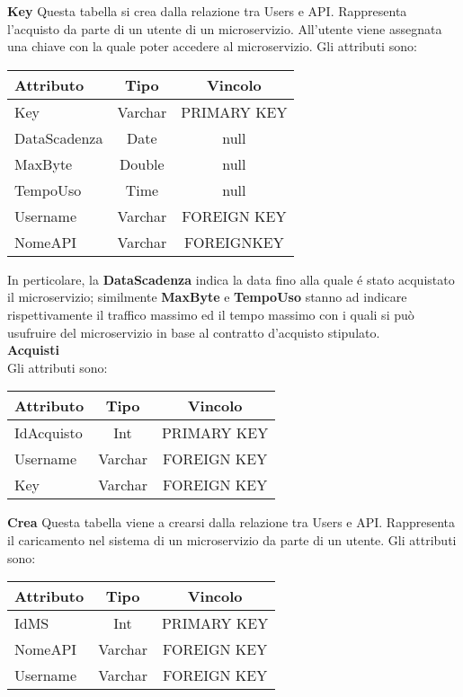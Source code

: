 {{		\textbf{Key}
			Questa tabella si crea dalla relazione tra Users e API. Rappresenta l'acquisto da parte di un utente di un microservizio. All'utente viene assegnata una chiave con la quale poter accedere al microservizio. Gli attributi sono:
			\begin{center}
			\begin{tabular}{lcc}
				\textbf{Attributo}&\textbf{Tipo}&\textbf{Vincolo}\\ \hline
				Key&Varchar&PRIMARY KEY\\
				DataScadenza&Date&null \\
				MaxByte&Double&null \\
				TempoUso&Time&null \\
				Username&Varchar&FOREIGN KEY\\
				NomeAPI&Varchar&FOREIGNKEY\\			
			\end{tabular}
			\end{center}
			In perticolare, la \textbf{DataScadenza} indica la data fino alla quale é stato acquistato il microservizio; similmente \textbf{MaxByte} e \textbf{TempoUso} stanno ad indicare rispettivamente il traffico massimo ed il tempo massimo con i quali si può usufruire del microservizio in base al contratto d'acquisto stipulato.\\
			
		\textbf{Acquisti}\\
		Gli attributi sono: \\
		\begin{center}
		\begin{tabular}{lcc}
			\textbf{Attributo}&\textbf{Tipo}&\textbf{Vincolo}\\ \hline
			IdAcquisto&Int&PRIMARY KEY\\
			Username&Varchar&FOREIGN KEY\\
			Key&Varchar&FOREIGN KEY\\
		\end{tabular}
		\end{center}
			
		\textbf{Crea}
			Questa tabella viene a crearsi dalla relazione tra Users e API. Rappresenta il caricamento nel sistema di un microservizio da parte di un utente. Gli attributi sono:
			\begin{center}
			\begin{tabular}{lcc}
				\textbf{Attributo}&\textbf{Tipo}&\textbf{Vincolo}\\ \hline
				IdMS&Int&PRIMARY KEY\\
				NomeAPI&Varchar&FOREIGN KEY\\
				Username&Varchar&FOREIGN KEY\\			
			\end{tabular}
			\end{center}
			
		}
	
}
